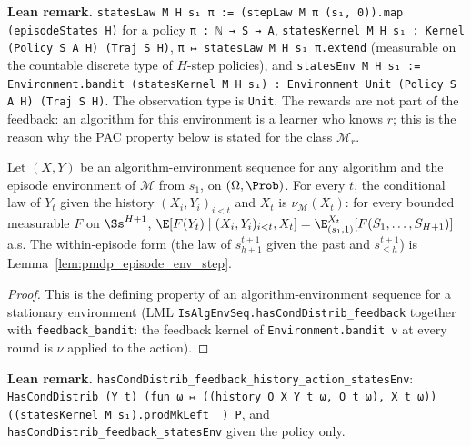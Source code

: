 \textbf{Lean remark.} \texttt{statesLaw M H s₁ π := (stepLaw M π (s₁, 0)).map (episodeStates H)}
for a policy \texttt{π : ℕ → S → A}, \texttt{statesKernel M H s₁ : Kernel (Policy S A H) (Traj S H)},
\texttt{π ↦ statesLaw M H s₁ π.extend} (measurable on the countable discrete type of
$H$-step policies), and \texttt{statesEnv M H s₁ := Environment.bandit (statesKernel M H s₁) : Environment Unit (Policy S A H) (Traj S H)}.
The observation type is \texttt{Unit}. The rewards are not part of the feedback: an
algorithm for this environment is a learner who knows $r$; this is the reason why the PAC
property below is stated for the class $\mathcal M_r$.

\begin{lemma}\label{lem:episode_env_law}
\leanok
{}
Let $(X, Y)$ be an algorithm-environment sequence for any algorithm and the episode
environment of $\mathcal M$ from $s_1$, on $(\Omega, \Prob)$. For every $t$, the conditional law of
$Y_t$ given the history $(X_i, Y_i)_{i < t}$ and $X_t$ is $\nu_{\mathcal M}(X_t)$: for every
bounded measurable $F$ on $\Ss^{H+1}$,
$\E[F(Y_t) \mid (X_i, Y_i)_{i < t}, X_t] = \E^{X_t}_{(s_1, 1)}[F(S_1, \dots, S_{H+1})]$ a.s. The
within-episode form (the law of $s^{t+1}_{h+1}$ given the past and $s^{t+1}_{\le h}$) is
Lemma~\ref{lem:pmdp_episode_env_step}.
\end{lemma}

\begin{proof}
\leanok
This is the defining property of an algorithm-environment sequence for a stationary environment
(LML \texttt{IsAlgEnvSeq.hasCondDistrib\_feedback} together with
\texttt{feedback\_bandit}: the feedback kernel of \texttt{Environment.bandit ν} at every
round is $\nu$ applied to the action).
\end{proof}

\textbf{Lean remark.} \texttt{hasCondDistrib\_feedback\_history\_action\_statesEnv}:
\texttt{HasCondDistrib (Y t) (fun ω ↦ ((history O X Y t ω, O t ω), X t ω)) ((statesKernel M s₁).prodMkLeft \_) P},
and \texttt{hasCondDistrib\_feedback\_statesEnv} given the policy only.

